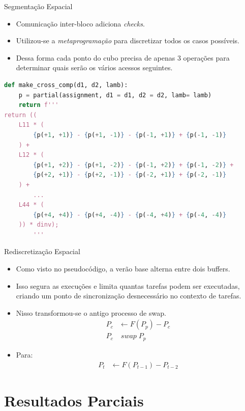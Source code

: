 \documentclass{beamer}
\begin{document}
\begin{frame}[fragile]{Segmentação Espacial}
  \begin{itemize}
  \item<+-> Comunicação inter-bloco adiciona \textit{checks}.
  \item<+-> Utilizou-se a \emph{metaprogramação} para discretizar todos os casos possíveis.
  \item<+-> Dessa forma cada ponto do cubo precisa de apenas 3 operações para determinar quais serão os vários acessos seguintes.
  \end{itemize}

  \lstset{basicstyle=\tiny}
  \begin{lstlisting}[language=python]
def make_cross_comp(d1, d2, lamb):
    p = partial(assignment, d1 = d1, d2 = d2, lamb= lamb)
    return f'''
return ((
    L11 * (
        {p(+1, +1)} - {p(+1, -1)} - {p(-1, +1)} + {p(-1, -1)}
    ) +
    L12 * (
        {p(+1, +2)} - {p(+1, -2)} - {p(-1, +2)} + {p(-1, -2)} + 
        {p(+2, +1)} - {p(+2, -1)} - {p(-2, +1)} + {p(-2, -1)}
    ) +
        ...
    L44 * (
        {p(+4, +4)} - {p(+4, -4)} - {p(-4, +4)} + {p(-4, -4)}
    )) * dinv);
        '''
   \end{lstlisting}
\end{frame}

\begin{frame}{Rediscretização Espacial}
  \begin{itemize}
  \item<+-> Como visto no pseudocódigo, a verão base alterna entre dois buffers.
  \item<+-> Isso segura as execuções e limita quantas tarefas podem ser executadas, criando um ponto de sincronização desnecessário no contexto de tarefas.
  \item<+-> Nisso transformou-se o antigo processo de swap.
    \begin{align*}
       P_c &\leftarrow F(P_p) - P_c \\
       P_c &\;swap\; P_p
    \end{align*}
  \item<+-> Para:
    \begin{align*}
      P_t  &\leftarrow F(P_{t-1}) - P_{t-2} 
    \end{align*}
    
  \end{itemize}
\end{frame}

\section{Resultados Parciais}
\end{document}
